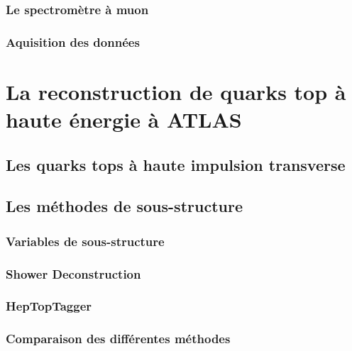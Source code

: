 \documentclass[12pt,canadien]{article}
\begin{document}
\subsubsection{Le spectromètre à muon}
\label{sec:lhc_atlas:atlas:mu}

\subsubsection{Aquisition des données}
\label{sec:lhc_atlas:atlas:daq}


\singlespacing{}
\section{La reconstruction de quarks top à haute énergie à ATLAS}
\label{sec:top}
\doublespacing{}

\subsection{Les quarks tops à haute impulsion transverse}
\label{sec:top:boosted}

\subsection{Les méthodes de sous-structure}
\label{sec:top:sous_structure}

\subsubsection{Variables de sous-structure}
\label{sec:top:sous_structure:variables}

\subsubsection{Shower Deconstruction}
\label{sec:top:sous_structure:shower}

\subsubsection{HepTopTagger}
\label{sec:top:sous_structure:hep}

\subsubsection{Comparaison des différentes méthodes}
\label{sec:top:sous_structure:comp}
\end{document}
